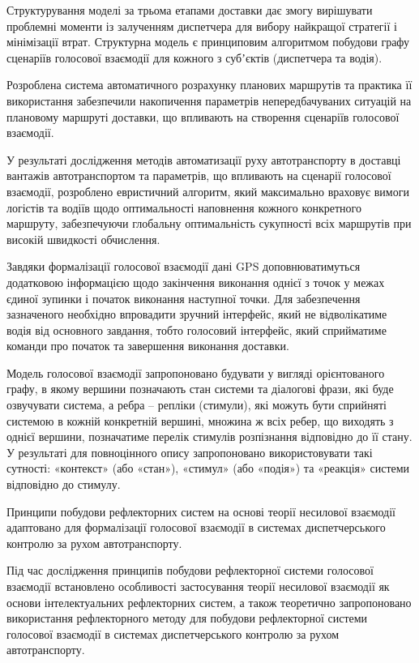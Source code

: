 Структурування моделі за трьома етапами доставки дає змогу вирішувати проблемні моменти із залученням диспетчера для вибору найкращої стратегії і мінімізації втрат. Структурна модель є принциповим алгоритмом побудови графу сценаріїв голосової взаємодії для кожного з субʼєктів (диспетчера та водія).

Розроблена система автоматичного розрахунку планових маршрутів та практика її використання забезпечили накопичення параметрів непередбачуваних ситуацій на плановому маршруті доставки, що впливають на створення сценаріїв голосової взаємодії.

У результаті дослідження методів автоматизації руху автотранспорту в доставці вантажів автотранспортом та параметрів, що впливають на сценарії голосової взаємодії, розроблено евристичний алгоритм, який максимально враховує вимоги логістів та водіїв щодо оптимальності наповнення кожного конкретного маршруту, забезпечуючи глобальну оптимальність сукупності всіх маршрутів при високій швидкості обчислення.

Завдяки формалізації голосової взаємодії дані GPS доповнюватимуться додатковою інформацією щодо закінчення виконання однієї з точок у межах єдиної зупинки і початок виконання наступної точки. Для забезпечення зазначеного необхідно впровадити зручний інтерфейс, який не відволікатиме водія від основного завдання, тобто голосовий інтерфейс, який сприйматиме команди про початок та завершення виконання доставки.

Модель голосової взаємодії запропоновано будувати у вигляді орієнтованого графу, в якому вершини позначають стан системи та діалогові фрази, які буде озвучувати система, а ребра – репліки (стимули), які можуть бути сприйняті системою в кожній конкретній вершині, множина ж всіх ребер, що виходять з однієї вершини, позначатиме перелік стимулів розпізнання відповідно до її стану. У результаті для повноцінного опису запропоновано використовувати такі сутності: «контекст» (або «стан»), «стимул» (або «подія») та «реакція» системи відповідно до стимулу.

Принципи побудови рефлекторних систем на основі теорії несилової взаємодії адаптовано для формалізації голосової взаємодії в системах диспетчерського контролю за рухом автотранспорту.

Під час дослідження принципів побудови рефлекторної системи голосової взаємодії встановлено особливості застосування теорії несилової взаємодії як основи інтелектуальних рефлекторних систем, а також теоретично запропоновано використання рефлекторного методу для побудови рефлекторної системи голосової взаємодії в системах диспетчерського контролю за рухом автотранспорту.


